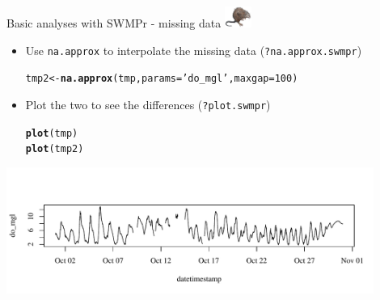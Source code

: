 \documentclass[xcolor=dvipsnames,serif]{beamer}\usepackage[]{graphicx}\usepackage[]{color}
\makeatletter
\newcommand{\hlnum}[1]{\textcolor[rgb]{0.686,0.059,0.569}{#1}}%
\newcommand{\hlstr}[1]{\textcolor[rgb]{0.192,0.494,0.8}{#1}}%
\newcommand{\hlstd}[1]{\textcolor[rgb]{0.345,0.345,0.345}{#1}}%
\newcommand{\hlkwb}[1]{\textcolor[rgb]{0.69,0.353,0.396}{#1}}%
\newcommand{\hlkwc}[1]{\textcolor[rgb]{0.333,0.667,0.333}{#1}}%
\newcommand{\hlkwd}[1]{\textcolor[rgb]{0.737,0.353,0.396}{\textbf{#1}}}%
\newenvironment{kframe}{%
 \def\at@end@of@kframe{}%
 \ifinner\ifhmode%
  \def\at@end@of@kframe{\end{minipage}}%
  \begin{minipage}{\columnwidth}%
 \fi\fi%
 \def\FrameCommand##1{\hskip\@totalleftmargin \hskip-\fboxsep
 \colorbox{shadecolor}{##1}\hskip-\fboxsep
     \hskip-\linewidth \hskip-\@totalleftmargin \hskip\columnwidth}%
 \MakeFramed {\advance\hsize-\width
   \@totalleftmargin\z@ \linewidth\hsize
   \@setminipage}}%
 {\par\unskip\endMakeFramed%
 \at@end@of@kframe}
\newenvironment{knitrout}{}{} %
\makeatother
\begin{document}
\begin{frame}[fragile]{Basic analyses with SWMPr - missing data \includegraphics[width = 0.065\textwidth]{imgs/swmprat.png}}
\begin{itemize}
\item {}
Use \texttt{na.approx} to interpolate the missing data (\texttt{?na.approx.swmpr})
\begin{knitrout}\scriptsize
{}\color{fgcolor}\begin{kframe}
\begin{alltt}
\hlstd{tmp2} \hlkwb{<-} \hlkwd{na.approx}\hlstd{(tmp,} \hlkwc{params} \hlstd{=} \hlstr{'do_mgl'}\hlstd{,} \hlkwc{maxgap} \hlstd{=} \hlnum{100}\hlstd{)}
\end{alltt}
\end{kframe}
\end{knitrout}
\vspace{0.1in}
\item {}
Plot the two to see the differences (\texttt{?plot.swmpr})
\begin{knitrout}\scriptsize
{}\color{fgcolor}\begin{kframe}
\begin{alltt}
\hlkwd{plot}\hlstd{(tmp)}
\hlkwd{plot}\hlstd{(tmp2)}
\end{alltt}
\end{kframe}
\end{knitrout}
\end{itemize}
\vspace{-0.4in}
\begin{knitrout}\scriptsize
{}\color{fgcolor}

{\centering \includegraphics[width=0.9\textwidth]{figure/unnamed-chunk-9-1} 

}




\end{knitrout}
\end{frame}
\end{document}
